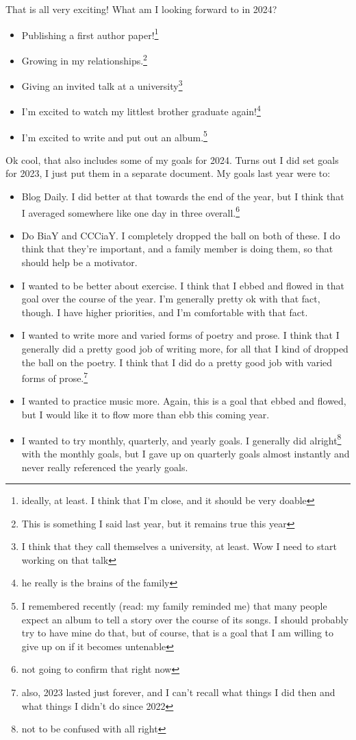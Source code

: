 \documentclass[12pt]{article}[titlepage]
\renewcommand{\,}{\textsuperscript{,}}
\begin{document}
That is all very exciting!
What am I looking forward to in 2024?

\begin{itemize}
\item Publishing a first author paper!\footnote{ideally, at least. I think that I'm close, and it should be very doable}
\item Growing in my relationships.\footnote{This is something I said last year, but it remains true this year}
\item Giving an invited talk at a university\footnote{I think that they call themselves a university, at least. Wow I need to start working on that talk}
\item I'm excited to watch my littlest brother graduate again!\footnote{he really is the brains of the family}
\item I'm excited to write and put out an album.\footnote{I remembered recently (read: my family reminded me) that many people expect an album to tell a story over the course of its songs. I should probably try to have mine do that, but of course, that is a goal that I am willing to give up on if it becomes untenable}
\end{itemize}

Ok cool, that also includes some of my goals for 2024.
Turns out I did set goals for 2023, I just put them in a separate document.
My goals last year were to:
\begin{itemize}
\item Blog Daily. I did better at that towards the end of the year, but I think that I averaged somewhere like one day in three overall.\footnote{not going to confirm that right now}
\item Do BiaY and CCCiaY. I completely dropped the ball on both of these. I do think that they're important, and a family member is doing them, so that should help be a motivator.
\item I wanted to be better about exercise. I think that I ebbed and flowed in that goal over the course of the year. I'm generally pretty ok with that fact, though. I have higher priorities, and I'm comfortable with that fact.
\item I wanted to write more and varied forms of poetry and prose. I think that I generally did a pretty good job of writing more, for all that I kind of dropped the ball on the poetry. I think that I did do a pretty good job with varied forms of prose.\footnote{also, 2023 lasted just forever, and I can't recall what things I did then and what things I didn't do since 2022}
\item I wanted to practice music more. Again, this is a goal that ebbed and flowed, but I would like it to flow more than ebb this coming year.
\item I wanted to try monthly, quarterly, and yearly goals.
I generally did alright\footnote{not to be confused with all right} with the monthly goals, but I gave up on quarterly goals almost instantly and never really referenced the yearly goals.
\end{itemize}
\end{document}
